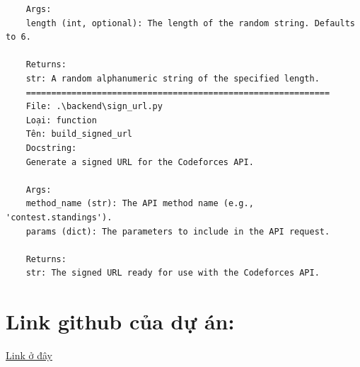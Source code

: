 \documentclass[12pt,a4paper]{article}
\begin{document}
\begin{verbatim}
	Args:
	length (int, optional): The length of the random string. Defaults to 6.
	
	Returns:
	str: A random alphanumeric string of the specified length.
	============================================================
	File: .\backend\sign_url.py
	Loại: function
	Tên: build_signed_url
	Docstring:
	Generate a signed URL for the Codeforces API.
	
	Args:
	method_name (str): The API method name (e.g., 'contest.standings').
	params (dict): The parameters to include in the API request.
	
	Returns:
	str: The signed URL ready for use with the Codeforces API.
	\end{verbatim}
	
	\section*{Link github của dự án:}
	
	\href{https://github.com/lethienquan28052006/icpcmanagementwebapp}{Link ở đây}
	
\end{document}
